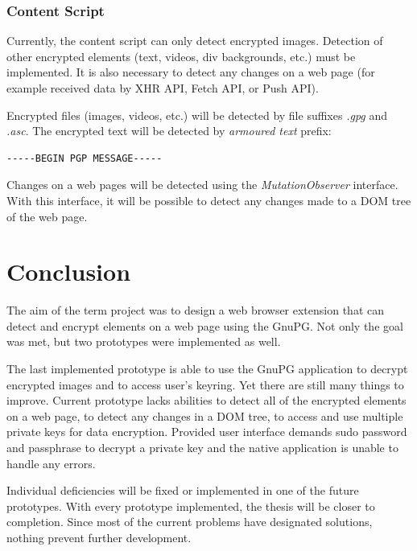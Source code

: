 \subsection{Content Script}
Currently, the content script can only detect encrypted images. Detection of other encrypted elements (text, videos, div backgrounds, etc.) must be implemented. It is also necessary to detect any changes on a web page (for example received data by XHR API, Fetch API, or Push
API).

Encrypted files (images, videos, etc.) will be detected by file suffixes \textit{.gpg} and \textit{.asc}. The encrypted text will be detected by \textit{armoured text} prefix:
\begin{verbatim}
-----BEGIN PGP MESSAGE-----
\end{verbatim}

Changes on a web pages will be detected using the \textit{MutationObserver} interface. With this interface, it will be possible to detect any changes made to a DOM tree of the web page.

\chapter{Conclusion} 
The aim of the term project was to design a web browser extension that can detect and encrypt elements on a web page using the GnuPG. Not only the goal was met, but two prototypes were implemented as well.

The last implemented prototype is able to use the GnuPG application to decrypt encrypted images and to access user's keyring. Yet there are still many things to improve. Current prototype lacks abilities to detect all of the encrypted elements on a web page, to detect any changes in a DOM tree, to access and use multiple private keys for data encryption. Provided user interface demands sudo password and passphrase to decrypt a private key and the native application is unable to handle any errors.

Individual deficiencies will be fixed or implemented in one of the future prototypes. With every prototype implemented, the thesis will be closer to completion. Since most of the current problems have designated solutions, nothing prevent further development.